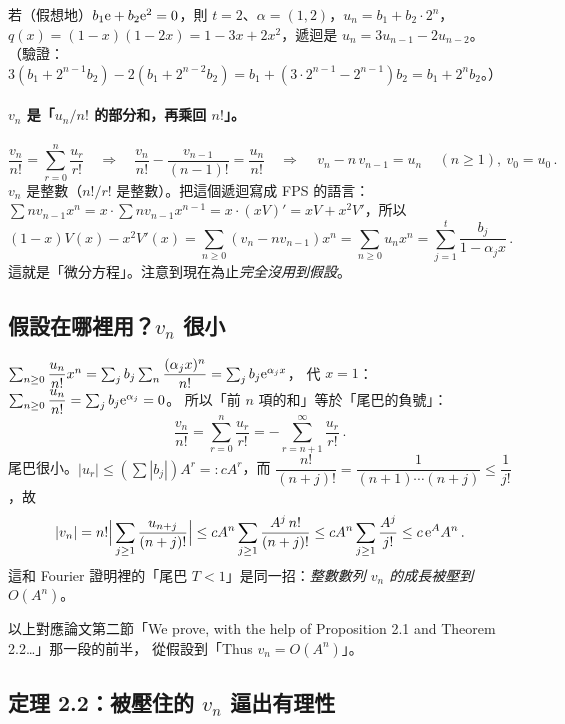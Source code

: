 \begin{exmp}
若（假想地）$b_1\mathrm{e}+b_2\mathrm{e}^2=0$，則 $t=2$、$\alpha=(1,2)$，$u_n=b_1+b_2\cdot2^n$，
$q(x)=(1-x)(1-2x)=1-3x+2x^2$，遞迴是 $u_n=3u_{n-1}-2u_{n-2}$。
（驗證：$3(b_1+2^{n-1}b_2)-2(b_1+2^{n-2}b_2)=b_1+(3\cdot2^{n-1}-2^{n-1})b_2=b_1+2^nb_2$。）
\end{exmp}

\paragraph{$v_n$ 是「$u_n/n!$ 的部分和，再乘回 $n!$」。}
\[
  \frac{v_n}{n!}=\sum_{r=0}^{n}\frac{u_r}{r!}\quad\Longrightarrow\quad
  \frac{v_n}{n!}-\frac{v_{n-1}}{(n-1)!}=\frac{u_n}{n!}\quad\Longrightarrow\quad
  \boxed{\,v_n-n\,v_{n-1}=u_n\,}\quad(n\ge1),\ v_0=u_0\,.
\]
$v_n$ 是整數（$n!/r!$ 是整數）。把這個遞迴寫成 FPS 的語言：
$\sum nv_{n-1}x^n=x\cdot\sum nv_{n-1}x^{n-1}=x\cdot(xV)'=xV+x^{2}V'$，所以
\begin{equation}\label{eq:ode}
  (1-x)V(x)-x^{2}V'(x)=\sum_{n\ge0}(v_n-nv_{n-1})x^n=\sum_{n\ge0}u_nx^n=\sum_{j=1}^{t}\frac{b_j}{1-\alpha_jx}\,.
\end{equation}
這就是「微分方程」。注意到現在為止\emph{完全沒用到假設}。

\subsection{假設在哪裡用？$v_n$ 很小}

$\sum_{n\ge0}\dfrac{u_n}{n!}x^n=\sum_j b_j\sum_n\dfrac{(\alpha_jx)^n}{n!}=\sum_jb_j\mathrm{e}^{\alpha_jx}$，
代 $x=1$：$\sum_{n\ge0}\dfrac{u_n}{n!}=\sum_jb_j\mathrm{e}^{\alpha_j}=0$。
所以「前 $n$ 項的和」等於「尾巴的負號」：
\[
  \frac{v_n}{n!}=\sum_{r=0}^{n}\frac{u_r}{r!}=-\sum_{r=n+1}^{\infty}\frac{u_r}{r!}\,.
\]
尾巴很小。$|u_r|\le(\sum|b_j|)A^{r}=:cA^{r}$，而 $\dfrac{n!}{(n+j)!}=\dfrac{1}{(n+1)\cdots(n+j)}\le\dfrac{1}{j!}$，故
\[
  |v_n|=n!\Big|\sum_{j\ge1}\frac{u_{n+j}}{(n+j)!}\Big|\le cA^{n}\sum_{j\ge1}\frac{A^{j}\,n!}{(n+j)!}
  \le cA^{n}\sum_{j\ge1}\frac{A^{j}}{j!}\le c\,\mathrm{e}^{A}A^{n}\,.
\]
這和 Fourier 證明裡的「尾巴 $T<1$」是同一招：\emph{整數數列 $v_n$ 的成長被壓到 $O(A^n)$}。

\begin{paperbox}
以上對應論文第二節「We prove, with the help of Proposition 2.1 and Theorem 2.2\ldots」那一段的前半，
從假設到「Thus $v_n=O(A^n)$」。
\end{paperbox}

\subsection{定理 2.2：被壓住的 $v_n$ 逼出有理性}

